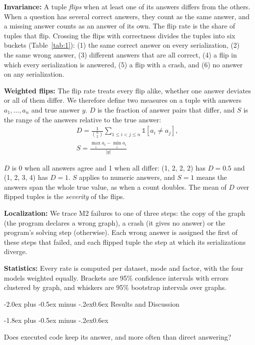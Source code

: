 \documentclass[11pt]{article}
\makeatletter
\renewcommand\section{\@startsection{section}{1}{\z@}
  {-2.0ex plus -0.5ex minus -.2ex}{0.6ex}
  {\large\bfseries\centering}}
\renewcommand\subsection{\@startsection{subsection}{2}{\z@}
  {-1.8ex plus -0.5ex minus -.2ex}{0.6ex}
  {\normalsize\bfseries\raggedright}}
\makeatother
\begin{document}
\textbf{Invariance:} A tuple \emph{flips} when at least one of its answers differs from the others. When a question has several correct answers, they count as the same answer, and a missing answer counts as an answer of its own. The flip rate is the share of tuples that flip. Crossing the flips with correctness divides the tuples into six buckets (Table~\ref{tab:1}): (1) the same correct answer on every serialization, (2) the same wrong answer, (3) different answers that are all correct, (4) a flip in which every serialization is answered, (5) a flip with a crash, and (6) no answer on any serialization.

\textbf{Weighted flips:} The flip rate treats every flip alike, whether one answer deviates or all of them differ. We therefore define two measures on a tuple with answers $a_1, \ldots, a_n$ and true answer $y$. $D$ is the fraction of answer pairs that differ, and $S$ is the range of the answers relative to the true answer:
\begin{gather*}
D = \frac{1}{\binom{n}{2}} \sum_{1 \le i < j \le n} \mathds{1}\left[a_i \neq a_j\right], \\
S = \frac{\max_{i} a_i - \min_{i} a_i}{|y|}
\end{gather*}

$D$ is 0 when all answers agree and 1 when all differ: (1, 2, 2, 2) has $D = 0.5$ and (1, 2, 3, 4) has $D = 1$. $S$ applies to numeric answers, and $S = 1$ means the answers span the whole true value, as when a count doubles. The mean of $D$ over flipped tuples is the \emph{severity} of the flips.

\textbf{Localization:} We trace M2 failures to one of three steps: the copy of the graph (the program declares a wrong graph), a crash (it gives no answer) or the program's solving step (otherwise). Each wrong answer is assigned the first of these steps that failed, and each flipped tuple the step at which its serializations diverge.

\textbf{Statistics:} Every rate is computed per dataset, mode and factor, with the four models weighted equally. Brackets are 95\% confidence intervals with errors clustered by graph, and whiskers are 95\% bootstrap intervals over graphs.

\section{Results and Discussion}

\subsection{Does executed code keep its answer, and more often than direct answering?}\label{sec:rq1}
\end{document}
